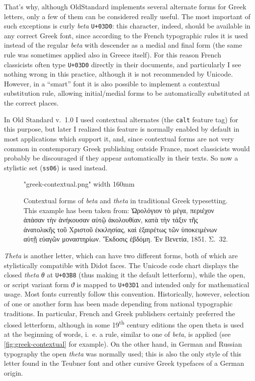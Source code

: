 \documentclass[12pt,a4paper,openany]{book}
\begin{document}
That’s why, although OldStandard implements several alternate forms for
Greek letters, only a few of them can be considered really useful. The most
important of such exceptions is curly \textit{beta} \texttt{U+03D0}: this character,
indeed, should be available in any correct Greek font, since according to
the French typographic rules it is used instead of the regular
\textit{beta} with descender as a medial and final form (the same rule was
sometimes applied also in Greece itself). For this reason French
classicists often type \texttt{U+03D0} directly in their documents, and particularly
I see nothing wrong in this practice, although it is not recommended by
Unicode. However, in a “smart” font it is also possible to implement
a contextual substitution rule, allowing initial/medial forms to be
automatically substituted at the correct places.

In Old Standard v.~1.0 I used contextual alternates (the \texttt{calt}
feature tag) for this purpose, but later I realized this feature is
normally enabled by default in most applications which support it, and,
since contextual forms are not very common in contemporary Greek publishing
outside France, most classicists would probably be discouraged if they appear
automatically in their texts. So now a stylistic set (\texttt{ss06}) 
is used instead.

\begin{figure}[htb]

\centerline{\XeTeXpicfile "greek-contextual.png" width 160mm}

\caption{Contextual forms of \textit{beta} and \textit{theta} in
traditional Greek typesetting. This example has been taken from: Ὡρολόγιον
τὸ μέγα, περιέχον ἁπάσαν τὴν ἀνήκουσαν αὐτῷ ἀκολουθίαν, κατὰ τὴν τάξιν τῆς
ἀνατολικῆς τοῦ Χριστοῦ ἐκκλησίας, καὶ ἐξαιρέτως τῶν ὑποκειμένων αὐτῇ εὐαγῶν
μοναστηρίων. Ἔκδοσις ἑβδόμη. Ἐν Βενετία, 1851. Σ.~32.}

\label{fig:greek-contextual}

\end{figure}

\textit{Theta} is another letter, which can have two different forms, both
of which are stylistically compatible with Didot faces. The Unicode
code chart displays the closed \textit{theta}
{\textit{θ}} at \texttt{U+03B8}
(thus making it the default letterform), while the open, or script variant
form \textit{ϑ} is mapped to \texttt{U+03D1} and intended only for mathematical
usage.  Most fonts currently follow this convention. Historically, however,
selection of one or another form has been made depending from national
typographic traditions. In particular, French and Greek publishers
certainly preferred the closed letterform, although in some
19\textsuperscript{th} century editions the open theta is used at the
beginning of words, i.~e. a rule, similar to one of \textit{beta}, is
applied (see \autoref{fig:greek-contextual} for example). On the other
hand, in German and Russian typography the open \textit{theta} was normally
used; this is also the only style of this letter found in the Teubner font
and other cursive Greek typefaces of a German origin.
\end{document}
